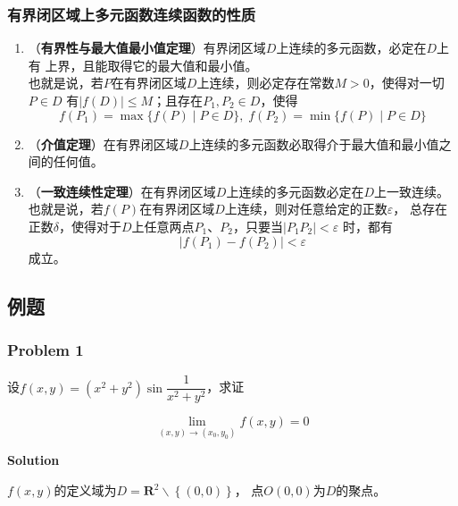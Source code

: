 \documentclass[12pt, a4paper]{article}
\numberwithin{equation}{section}
\begin{document}
\subsubsection{有界闭区域上多元函数连续函数的性质}

    \begin{enumerate}
        \item （\textbf{有界性与最大值最小值定理}）有界闭区域\(D\)上连续的多元函数，必定在\(D\)上有
            上界，且能取得它的最大值和最小值。\\
            也就是说，若\(P\)在有界闭区域\(D\)上连续，则必定存在常数\(M>0\)，使得对一切\(P \in D\)
            有\(\left|f\left(D\right)\right| \leq M\)；且存在\(P_1,P_2 \in D\)，使得
            $$
                f\left(P_1\right)=\max \{f(P) \mid P \in D\},\; f\left(P_2\right)=\min \{f(P) \mid P \in D\}
            $$
        \item （\textbf{介值定理}）在有界闭区域\(D\)上连续的多元函数必取得介于最大值和最小值之间的任何值。
        \item （\textbf{一致连续性定理}）在有界闭区域\(D\)上连续的多元函数必定在\(D\)上一致连续。\\
            也就是说，若\(f\left(P\right)\)在有界闭区域\(D\)上连续，则对任意给定的正数\(\varepsilon\)，
            总存在正数\(\delta\)，使得对于\(D\)上任意两点\(P_1\)、\(P_2\)，只要当\(\left|P_1P_2\right| < \varepsilon\)
            时，都有
            $$
                \left|f\left(P_1\right) - f\left(P_2\right)\right| < \varepsilon
            $$
            成立。
    \end{enumerate}

\subsection{例题}

\subsubsection{Problem 1}

    设\(f\left(x,y\right) = \left(x^2+y^2\right)\sin \dfrac{1}{x^2+y^2}\)，求证

    \[
        \lim_{\left(x,y\right) \rightarrow \left(x_0,y_0\right)}f\left(x,y\right) = 0
    \]
    \vspace{1em}

    \textbf{Solution}
    \vspace{1em}

    \(f\left(x,y\right)\)的定义域为\(D = \mathbf{R}^2 \backslash \left\{\left(0,0\right)\right\}\)，
    点\(O\left(0,0\right)\)为\(D\)的聚点。
\end{document}
